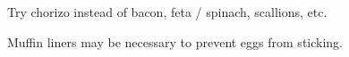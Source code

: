 \begin{variation}
\item Try chorizo instead of bacon, feta / spinach, scallions, etc.
\end{variation}


\begin{experiments}
\item Muffin liners may be necessary to prevent eggs from sticking.
\end{experiments}


\recipeend
